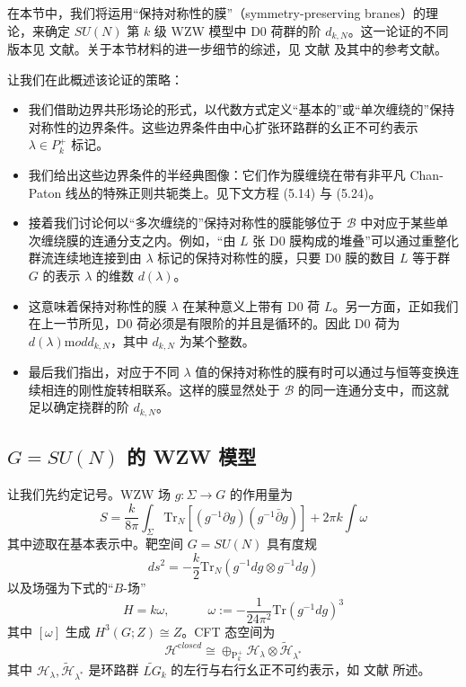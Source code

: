\documentclass[11pt,a4paper]{ctexart}
\begin{document}
在本节中，我们将运用``保持对称性的膜''（symmetry-preserving branes）的理论，来确定 \(SU(N)\) 第 \(k\) 级 WZW 模型中 D0 荷群的阶 \(d_{k,N}\)。这一论证的不同版本见 文献。关于本节材料的进一步细节的综述，见 文献 及其中的参考文献。

让我们在此概述该论证的策略：

\begin{itemize}
\item
  我们借助边界共形场论的形式，以代数方式定义``基本的''或``单次缠绕的''保持对称性的边界条件。这些边界条件由中心扩张环路群的幺正不可约表示 \(\lambda \in P^+_k\) 标记。
\item
  我们给出这些边界条件的半经典图像：它们作为膜缠绕在带有非平凡 Chan-Paton 线丛的特殊正则共轭类上。见下文方程 (5.14) 与 (5.24)。
\item
  接着我们讨论何以``多次缠绕的''保持对称性的膜能够位于 \({\mathcal B}\) 中对应于某些单次缠绕膜的连通分支之内。例如，``由 \(L\) 张 D0 膜构成的堆叠''可以通过重整化群流连续地连接到由 \(\lambda\) 标记的保持对称性的膜，只要 D0 膜的数目 \(L\) 等于群 \(G\) 的表示 \(\lambda\) 的维数 \(d(\lambda)\)。
\item
  这意味着保持对称性的膜 \(\lambda\) 在某种意义上带有 D0 荷 \(L\)。另一方面，正如我们在上一节所见，D0 荷必须是有限阶的并且是循环的。因此 D0 荷为 \(d(\lambda) {\mathrm mod} d_{k,N}\)，其中 \(d_{k,N}\) 为某个整数。
\item
  最后我们指出，对应于不同 \(\lambda\) 值的保持对称性的膜有时可以通过与恒等变换连续相连的刚性旋转相联系。这样的膜显然处于 \({\mathcal B}\) 的同一连通分支中，而这就足以确定挠群的阶 \(d_{k,N}\)。
\end{itemize}

\subsection{\texorpdfstring{\(G=SU(N)\) 的 WZW 模型}{G=SU(N) 的 WZW 模型}}\label{gsun-ux7684-wzw-ux6a21ux578b}

让我们先约定记号。WZW 场 \(g: \Sigma \to G\) 的作用量为 \[S = \frac{k}{8 \pi} \int_{\Sigma}   {\mathrm{Tr}}_N [
(g^{-1}\partial g) (g^{-1}\bar{\partial}  g)] + {2 \pi k } \int \omega\] 其中迹取在基本表示中。靶空间 \(G=SU(N)\) 具有度规 \[ds^2 = -\frac{k}{2} {\mathrm{Tr}}_N (g^{-1}dg\otimes g^{-1} dg)\] 以及场强为下式的``\(B\)-场'' \[H = k \omega, \qquad   \quad \omega:= -\frac{1}{24 \pi^2}{\mathrm{Tr}}(g^{-1} dg)^3\] 其中 \([\omega]\) 生成 \(H^3(G;Z) \cong Z\)。CFT 态空间为 \[{\mathcal H}^{\mathrm closed} \cong \oplus_{\mathrm P^+_k} {\mathcal H}_\lambda \otimes \tilde {\mathcal H}_{\lambda^*}\] 其中 \({\mathcal H}_{\lambda},  \tilde {\mathcal H}_{\lambda^*}\) 是环路群 \(\widetilde{LG}_k\) 的左行与右行幺正不可约表示，如 文献 所述。
\end{document}
